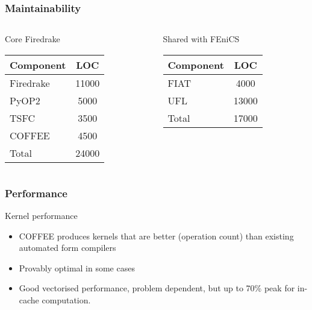 \documentclass[presentation]{beamer}
\begin{document}
\begin{frame}
  \frametitle{Maintainability}
  \begin{columns}
    \begin{column}[t]{0.5\textwidth}
      \begin{block}{Core Firedrake}
        \begin{table}
          \centering
          \begin{tabular}{lc}
            Component & LOC \\
            \hline
            Firedrake & 11000 \\
            PyOP2     & 5000 \\
            TSFC      & 3500 \\
            COFFEE    & 4500 \\
            \hline
            Total     & 24000
          \end{tabular}
        \end{table}
      \end{block}
    \end{column}
    \begin{column}[t]{0.5\textwidth}
      \begin{block}{Shared with FEniCS}
        \begin{table}
          \centering
          \begin{tabular}{lc}
            Component & LOC \\
            \hline
            FIAT & 4000 \\
            UFL     & 13000 \\
            \hline
            Total & 17000
          \end{tabular}
        \end{table}        
      \end{block}
    \end{column}
  \end{columns}
\end{frame}
\begin{frame}[allowframebreaks]
  \frametitle{Performance}

  \begin{block}{Kernel performance}
    \begin{itemize}
    \item COFFEE produces kernels that are better (operation count)
      than existing automated form compilers
    \item Provably optimal in some cases
    \item Good vectorised performance, problem dependent, but up to
      70\% peak for in-cache computation.
    \end{itemize}
  \end{block}

\end{frame}
\end{document}
